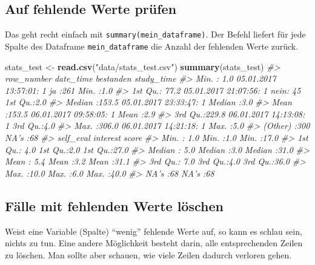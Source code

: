 \documentclass[12pt,ngerman,]{book}
\makeatletter
\newenvironment{Shaded}{\begin{snugshade}}{\end{snugshade}}
\newcommand{\KeywordTok}[1]{\textcolor[rgb]{0.13,0.29,0.53}{\textbf{#1}}}
\newcommand{\StringTok}[1]{\textcolor[rgb]{0.31,0.60,0.02}{#1}}
\newcommand{\CommentTok}[1]{\textcolor[rgb]{0.56,0.35,0.01}{\textit{#1}}}
\newcommand{\NormalTok}[1]{#1}
\newenvironment{kframe}{%
\medskip{}
\setlength{\fboxsep}{.8em}
 \def\at@end@of@kframe{}%
 \ifinner\ifhmode%
  \def\at@end@of@kframe{\end{minipage}}%
  \begin{minipage}{\columnwidth}%
 \fi\fi%
 \def\FrameCommand##1{\hskip\@totalleftmargin \hskip-\fboxsep
 \colorbox{shadecolor}{##1}\hskip-\fboxsep
     \hskip-\linewidth \hskip-\@totalleftmargin \hskip\columnwidth}%
 \MakeFramed {\advance\hsize-\width
   \@totalleftmargin\z@ \linewidth\hsize
   \@setminipage}}%
 {\par\unskip\endMakeFramed%
 \at@end@of@kframe}
\renewenvironment{Shaded}{\begin{kframe}}{\end{kframe}}
\theoremstyle{definition}
\theoremstyle{definition}
\theoremstyle{remark}
\makeatother
\begin{document}
\subsection{Auf fehlende Werte prüfen}\label{auf-fehlende-werte-prufen}

Das geht recht einfach mit \texttt{summary(mein\_dataframe)}. Der Befehl
liefert für jede Spalte des Dataframe \texttt{mein\_dataframe} die
Anzahl der fehlenden Werte zurück.

\begin{Shaded}
\begin{Highlighting}[]
\NormalTok{stats_test <-}\StringTok{ }\KeywordTok{read.csv}\NormalTok{(}\StringTok{"data/stats_test.csv"}\NormalTok{)}
\KeywordTok{summary}\NormalTok{(stats_test)}
\CommentTok{#>    row_number                  date_time   bestanden    study_time }
\CommentTok{#>  Min.   :  1.0   05.01.2017 13:57:01:  1   ja  :261   Min.   :1.0  }
\CommentTok{#>  1st Qu.: 77.2   05.01.2017 21:07:56:  1   nein: 45   1st Qu.:2.0  }
\CommentTok{#>  Median :153.5   05.01.2017 23:33:47:  1              Median :3.0  }
\CommentTok{#>  Mean   :153.5   06.01.2017 09:58:05:  1              Mean   :2.9  }
\CommentTok{#>  3rd Qu.:229.8   06.01.2017 14:13:08:  1              3rd Qu.:4.0  }
\CommentTok{#>  Max.   :306.0   06.01.2017 14:21:18:  1              Max.   :5.0  }
\CommentTok{#>                  (Other)            :300              NA's   :68   }
\CommentTok{#>    self_eval       interest       score     }
\CommentTok{#>  Min.   : 1.0   Min.   :1.0   Min.   :17.0  }
\CommentTok{#>  1st Qu.: 4.0   1st Qu.:2.0   1st Qu.:27.0  }
\CommentTok{#>  Median : 5.0   Median :3.0   Median :31.0  }
\CommentTok{#>  Mean   : 5.4   Mean   :3.2   Mean   :31.1  }
\CommentTok{#>  3rd Qu.: 7.0   3rd Qu.:4.0   3rd Qu.:36.0  }
\CommentTok{#>  Max.   :10.0   Max.   :6.0   Max.   :40.0  }
\CommentTok{#>  NA's   :68     NA's   :68}
\end{Highlighting}
\end{Shaded}

\subsection{Fälle mit fehlenden Werte
löschen}\label{falle-mit-fehlenden-werte-loschen}

Weist eine Variable (Spalte) ``wenig'' fehlende Werte auf, so kann es
schlau sein, nichts zu tun. Eine andere Möglichkeit besteht darin, alle
entsprechenden Zeilen zu löschen. Man sollte aber schauen, wie viele
Zeilen dadurch verloren gehen.
\end{document}
